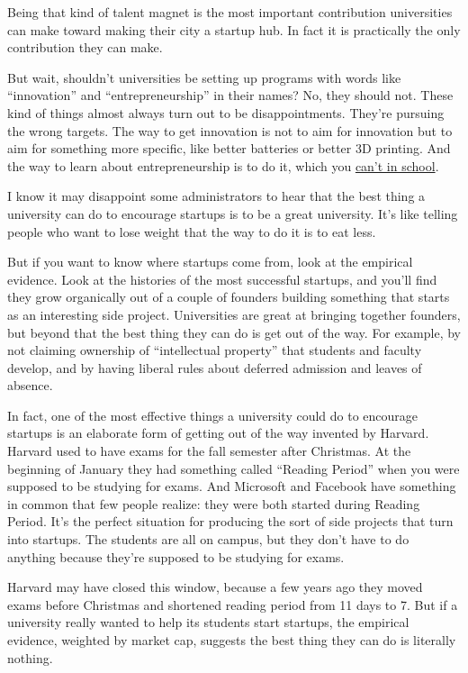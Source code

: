 \documentclass[12pt]{book}
\begin{document}
Being that kind of talent magnet is the most important contribution
universities can make toward making their city a startup hub. In fact it
is practically the only contribution they can make.

But wait, shouldn't universities be setting up programs with words like
``innovation'' and ``entrepreneurship'' in their names? No, they should
not. These kind of things almost always turn out to be disappointments.
They're pursuing the wrong targets. The way to get innovation is not to
aim for innovation but to aim for something more specific, like better
batteries or better 3D printing. And the way to learn about
entrepreneurship is to do it, which you \href{before.html}{can't in
school}.

I know it may disappoint some administrators to hear that the best thing
a university can do to encourage startups is to be a great university.
It's like telling people who want to lose weight that the way to do it
is to eat less.

But if you want to know where startups come from, look at the empirical
evidence. Look at the histories of the most successful startups, and
you'll find they grow organically out of a couple of founders building
something that starts as an interesting side project. Universities are
great at bringing together founders, but beyond that the best thing they
can do is get out of the way. For example, by not claiming ownership of
``intellectual property'' that students and faculty develop, and by
having liberal rules about deferred admission and leaves of absence.

In fact, one of the most effective things a university could do to
encourage startups is an elaborate form of getting out of the way
invented by Harvard. Harvard used to have exams for the fall semester
after Christmas. At the beginning of January they had something called
``Reading Period'' when you were supposed to be studying for exams. And
Microsoft and Facebook have something in common that few people realize:
they were both started during Reading Period. It's the perfect situation
for producing the sort of side projects that turn into startups. The
students are all on campus, but they don't have to do anything because
they're supposed to be studying for exams.

Harvard may have closed this window, because a few years ago they moved
exams before Christmas and shortened reading period from 11 days to 7.
But if a university really wanted to help its students start startups,
the empirical evidence, weighted by market cap, suggests the best thing
they can do is literally nothing.
\end{document}
